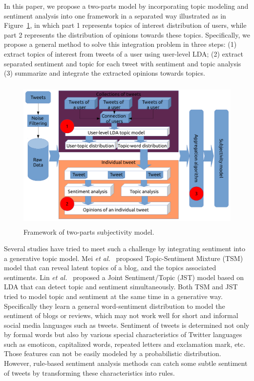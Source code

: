 \documentclass[runningheads,a4paper]{llncs}
\begin{document}
In this paper, we propose a two-parts model by incorporating topic modeling and sentiment analysis into one framework in a separated way illustrated as in Figure~\ref{fig1}, in which part 1 represents topics of interest distribution of users, while part 2 represents the distribution of opinions towards these topics. Specifically, we propose a general method to solve this integration problem in three steps: (1) extract topics of interest from tweets of a user using user-level LDA; (2) extract separated sentiment and topic for each tweet with sentiment and topic analysis  (3) summarize and integrate the extracted opinions towards topics.
\begin{figure}[htb]
\centering
\includegraphics[width=5.0in,height=3.0in]{procedure.pdf}
\caption{Framework of two-parts subjectivity model.}
\label{fig1}
\end{figure}


Several studies have tried to meet such a challenge by integrating sentiment into a generative topic model. Mei \emph{et al.}~\cite{mei2007topic} proposed Topic-Sentiment Mixture (TSM) model that can reveal latent topics of a blog, and the topics associated sentiments. Lin \emph{et al.}~\cite{lin2009joint} proposed a Joint Sentiment/Topic (JST) model based on LDA that can detect topic and sentiment simultaneously. Both TSM and JST tried to model topic and sentiment at the same time in a generative way. Specifically they learn a general word-sentiment distribution to model the sentiment of blogs or reviews, which may not work well for short and informal social media languages such as tweets. Sentiment of tweets is determined not only by formal words but also by various special characteristics of Twitter languages such as emoticon, capitalized words, repeated letters and exclamation mark, etc. Those features can not be easily modeled by a probabilistic distribution.  However, rule-based sentiment analysis methods can catch some subtle sentiment of tweets by transforming these characteristics into rules. 
\end{document}
